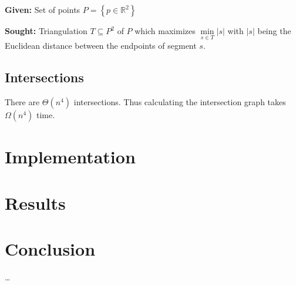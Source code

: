 \documentclass[
	a4paper,
	abstracton,
	english,
	twoside
] {scrreprt}
\theoremstyle{break}
\newcommand{\R}{\mathbb{R}}
\begin{document}
\begin{problem}\hfill
	\begin{labeling}{\hspace{4em}}
		\item[\textbf{Given:}]
			Set of points \(P=\left\{p\in\R^2\right\}\)
		\item[\textbf{Sought:}]
			Triangulation \(T\subseteq P^2\) of \(P\) which maximizes \(\min\limits_{s\in T} |s|\) 
			with \(|s|\) being the Euclidean distance between the endpoints of segment \(s\).
	\end{labeling}
\end{problem}

\section{Intersections}
There are \(\Theta(n^4)\) intersections. \cite{quadrilaterals_bound} Thus calculating the intersection graph
takes \(\Omega(n^4)\) time. 

\chapter{Implementation}

\chapter{Results}

\chapter{Conclusion}
\ldots

\printbibliography

\listoftodos
\end{document}
